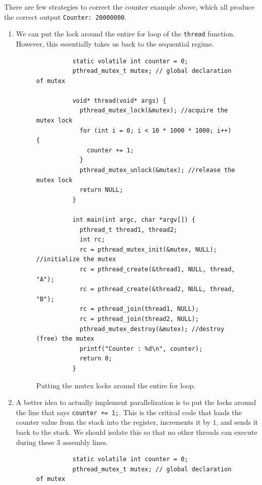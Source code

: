 \documentclass{article}
\begin{document}
    There are few strategies to correct the counter example above, which all produce the correct output \texttt{Counter: 20000000}. 
    \begin{enumerate}
      \item We can put the lock around the entire for loop of the \texttt{thread} function. However, this essentially takes us back to the sequential regime. 

      \begin{figure}[H]
        \centering 
        \begin{lstlisting}
          static volatile int counter = 0; 
          pthread_mutex_t mutex; // global declaration of mutex

          void* thread(void* args) {
            pthread_mutex_lock(&mutex); //acquire the mutex lock
            for (int i = 0; i < 10 * 1000 * 1000; i++) {
              counter += 1; 
            }
            pthread_mutex_unlock(&mutex); //release the mutex lock
            return NULL; 
          }

          int main(int argc, char *argv[]) {
            pthread_t thread1, thread2; 
            int rc; 
            rc = pthread_mutex_init(&mutex, NULL); //initialize the mutex
            rc = pthread_create(&thread1, NULL, thread, "A"); 
            rc = pthread_create(&thread2, NULL, thread, "B"); 
            rc = pthread_join(thread1, NULL); 
            rc = pthread_join(thread2, NULL); 
            pthread_mutex_destroy(&mutex); //destroy (free) the mutex
            printf("Counter : %d\n", counter); 
            return 0; 
          }
        \end{lstlisting}
        \caption{Putting the mutex locks around the entire for loop. } 
        \label{fig:first_try}
      \end{figure}

      \item A better idea to actually implement parallelization is to put the locks around the line that says \texttt{counter += 1;}. This is the critical code that loads the counter value from the stack into the register, increments it by $1$, and sends it back to the stack. We should isolate this so that no other threads can execute during these 3 assembly lines. 

      \begin{figure}[H]
        \centering 
        \begin{lstlisting}
          static volatile int counter = 0; 
          pthread_mutex_t mutex; // global declaration of mutex


\end{lstlisting}
\end{figure}
\end{enumerate}
\end{document}
